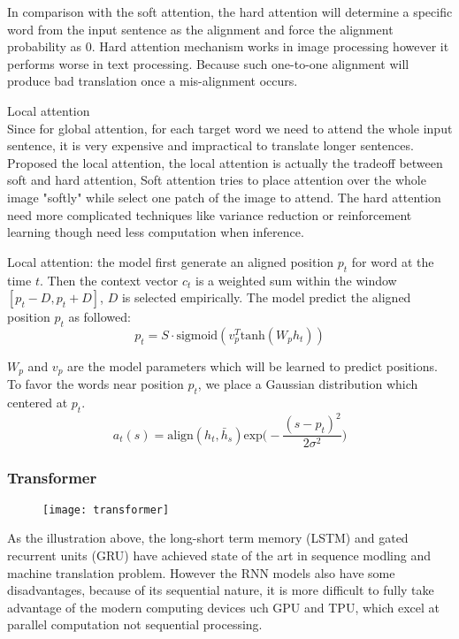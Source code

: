 	In comparison with the soft attention, the hard attention will determine a specific word from the input sentence as the alignment and force the alignment probability as ${0}$.  Hard attention mechanism works in image processing however it performs worse in text processing. Because such one-to-one alignment will produce bad translation once a mis-alignment occurs. \cite{luong2015effective} 

	
	Local attention \\
	Since for global attention, for each target word we need to attend the whole input sentence, it is very expensive and impractical to translate longer sentences. Proposed the local attention, the local attention is actually the  tradeoff between soft and hard attention, Soft attention tries to place attention over the whole image "softly" while select one patch of the image to attend. The hard attention need more complicated techniques like variance reduction or reinforcement learning though need less computation when inference.
	
	Local attention: the model first generate an aligned position ${p_t}$ for word at the time ${t}$. Then the context vector ${c_t}$ is a weighted sum within the window ${[p_t-D, p_t+D]}$, ${D}$ is selected empirically. The model predict the aligned  position ${p_t}$ as followed:
	\[ p_t = S \cdot \text{sigmoid}(v_p^T \text{tanh}(W_ph_t))\]
	
	${W_p}$ and ${v_p}$ are the model parameters which will be learned to predict positions.
	To favor the words near position ${p_t}$, we place a Gaussian distribution which centered at ${p_t}$.
	\[a_t(s) = \text{align}(h_t, \bar{h}_s)\text{exp}\Big(-\frac{(s-p_t)^2}{2 \sigma^2}\Big) \]

	\subsubsection{Transformer}
		\begin{figure}[t]
		\texttt{[image: transformer]}
		\centering
	\end{figure}
	As the illustration above, the long-short term memory (LSTM) and gated recurrent units (GRU) have achieved state of the art in sequence modling and machine translation problem. However the RNN models also have some disadvantages, because of its sequential nature, it is more difficult to fully take advantage of the modern computing devices uch GPU and TPU, which excel at parallel computation not sequential processing.
	
